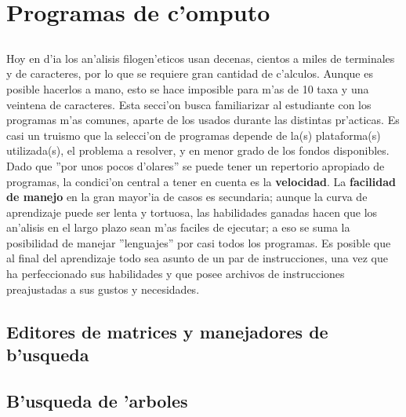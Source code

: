\chapter{Programas de c'omputo}
\section*{}
\label{ch:programas}

Hoy en d'ia los an'alisis filogen'eticos usan decenas, cientos a 
miles de terminales y de caracteres, por lo que se requiere gran 
cantidad de c'alculos. Aunque es posible hacerlos a mano, esto se 
hace imposible para m'as de 10 taxa y una veintena de caracteres. 
Esta secci'on busca familiarizar al estudiante con los programas 
m'as comunes, aparte de los usados durante las distintas pr'acticas. 
Es casi un truismo que la selecci'on de programas depende de la(s) 
plataforma(s) utilizada(s), el problema a resolver, y en menor grado 
de los fondos disponibles. Dado que ''por unos pocos d'olares'' se 
puede tener un repertorio apropiado de programas, la condici'on 
central a tener en cuenta es la \textbf{velocidad}. 
La \textbf{facilidad de manejo} en la gran mayor'ia de casos es secundaria; 
aunque la curva de aprendizaje puede ser lenta y tortuosa, las 
habilidades ganadas hacen que los an'alisis en el largo plazo sean 
m'as faciles de ejecutar; a eso se suma la posibilidad de manejar 
''lenguajes'' por casi todos los programas. Es posible que al final 
del aprendizaje todo sea asunto de un par de instrucciones, una vez 
que ha perfeccionado sus habilidades y que posee archivos de 
instrucciones preajustadas a sus gustos y necesidades.

\section{Editores de matrices y manejadores de b'usqueda}


\section{B'usqueda de 'arboles}





%
%
%


